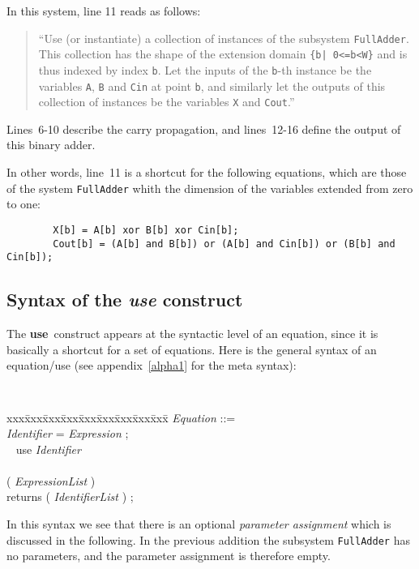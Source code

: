 In this system, line 11 reads as follows: 
\begin{quote}
``Use (or instantiate)
a collection of
instances of the subsystem \texttt{FullAdder}. This collection has the
shape of the extension domain \verb!{b| 0<=b<W}! and is thus indexed
by index \texttt{b}. Let the inputs of the \texttt{b}-th instance be
the variables \texttt{A}, \texttt{B} and \texttt{Cin} at point
\texttt{b}, and similarly let the outputs of this collection of
instances be the variables \texttt{X} and \texttt{Cout}.''
\end{quote}
Lines~6-10 describe the carry propagation, and lines~12-16
define the output of this binary adder.

In other words, line~11 is a shortcut for the following equations,
which are those of the system \texttt{FullAdder} whith the dimension
of the variables extended from zero to one:

\begin{verbatim}
        X[b] = A[b] xor B[b] xor Cin[b];
        Cout[b] = (A[b] and B[b]) or (A[b] and Cin[b]) or (B[b] and Cin[b]);
\end{verbatim}


\subsection{Syntax of the \emph{use} construct}

The \textbf{use}\ construct appears at the syntactic level of an
equation, since it is basically a shortcut for a set of
equations. Here is the general syntax of an equation/use (see
appendix~\ref{alpha1} for the meta syntax):
{\tt
\begin{tabbing}
xxx\= xxx\= xxx\= xxx\= xxx\= xxx\= xxx\= xxx\= xxx\=  \kill
\textsl{Equation} ::=\\
\>\> \textsl{Identifier} = \textsl{Expression} ;\\
\> \Alt\ \> use  \textsl{Identifier}\\
\>\>\>\>\>\>  \\
\>\>\>\>\>\>( \textsl{ExpressionList} )\\
\>\>\> returns\>\>\> ( \textsl{IdentifierList} ) ;
\end{tabbing}
}
 
In this syntax we see that there is an optional \emph{parameter
assignment} which is discussed in the following.
In the previous addition the subsystem \texttt{FullAdder} has
no parameters, and the parameter assignment is therefore empty. 

